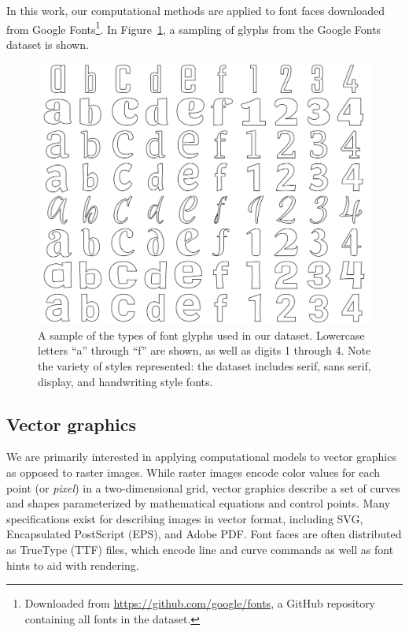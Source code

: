 In this work, our computational methods are applied to font faces downloaded from Google Fonts\footnote{Downloaded from \url{https://github.com/google/fonts}, a GitHub repository containing all fonts in the dataset.}.
In Figure~\ref{fig:input_fonts}, a sampling of glyphs from the Google Fonts dataset is shown.

\begin{figure}[]
	\includegraphics[width=\textwidth]{figures/input_fonts}
    \caption[A sample of the types of font faces used in our fonts dataset]{A sample of the types of font glyphs used in our dataset. Lowercase letters ``a'' through ``f'' are shown, as well as digits 1 through 4. Note the variety of styles represented: the dataset includes serif, sans serif, display, and handwriting style fonts.\label{fig:input_fonts}}
\end{figure}

\subsection{Vector graphics}
We are primarily interested in applying computational models to vector graphics as opposed to raster images.
While raster images encode color values for each point (or \textit{pixel}) in a two-dimensional grid, vector graphics describe a set of curves and shapes parameterized by mathematical equations and control points.
Many specifications exist for describing images in vector format, including SVG, Encapsulated PostScript (EPS), and Adobe PDF\@.
Font faces are often distributed as TrueType (TTF) files, which encode line and curve commands as well as font hints to aid with rendering.

